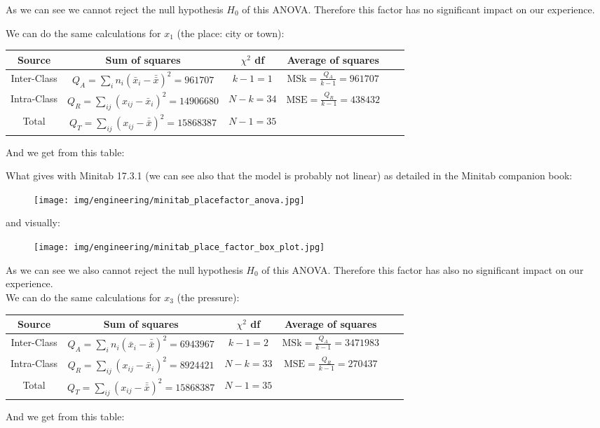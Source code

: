 	As we can see we cannot reject the null hypothesis $H_0$ of this ANOVA. Therefore this factor has no significant impact on our experience.
	
	We can do the same calculations for $x_1$ (the place: city or town):
	\begin{table}[H]\small
	\renewcommand{\arraystretch}{1.2}
	\begin{tabular}{cccccc}\hline
	Source & Sum of squares & $\chi^2$ df & Average of squares \\ \hline
	Inter-Class & $Q_A=\displaystyle\sum_{i}n_i\left(\bar{x}_{i}-\bar{\bar{x}}\right)^2=961707$ & $k-1=1$ & $\text{MSk}=\displaystyle\frac{Q_A}{k-1}=961707$ \\
	Intra-Class & $Q_R=\displaystyle\sum_{ij}\left(x_{ij}-\bar{x}_i\right)^2=14906680$ & $N-k=34$ & $ \text{MSE}=\displaystyle\frac{Q_R}{k-1}=438432$ \\
	Total & $Q_T=\displaystyle\sum_{ij}\left(x_{ij}-\bar{\bar{x}}\right)^2=15868387$ & $N-1=35$ & \\ \hline
	\end{tabular}
	\end{table}
	And we get from this table:
	
	What gives with Minitab 17.3.1 (we can see also that the model is probably not linear) as detailed in the Minitab companion book:
	\begin{figure}[H]
		\begin{center}
		\texttt{[image: img/engineering/minitab\_placefactor\_anova.jpg]}
		\end{center}	
	\end{figure}
	and visually:
	\begin{figure}[H]
		\begin{center}
		\texttt{[image: img/engineering/minitab\_place\_factor\_box\_plot.jpg]}
		\end{center}	
	\end{figure}	
	As we can see we also cannot reject the null hypothesis $H_0$ of this ANOVA. Therefore this factor has also no significant impact on our experience.\\
	
	We can do the same calculations for $x_3$ (the pressure):
	\begin{table}[H]\small
	\renewcommand{\arraystretch}{1.2}
	\begin{tabular}{cccccc}\hline
	Source & Sum of squares & $\chi^2$ df & Average of squares \\ \hline
	Inter-Class & $Q_A=\displaystyle\sum_{i}n_i\left(\bar{x}_{i}-\bar{\bar{x}}\right)^2=6943967$ & $k-1=2$ & $\text{MSk}=\displaystyle\frac{Q_A}{k-1}=3471983$ \\
	Intra-Class & $Q_R=\displaystyle\sum_{ij}\left(x_{ij}-\bar{x}_i\right)^2=8924421$ & $N-k=33$ & $ \text{MSE}=\displaystyle\frac{Q_R}{k-1}=270437$ \\
	Total & $Q_T=\displaystyle\sum_{ij}\left(x_{ij}-\bar{\bar{x}}\right)^2=15868387$ & $N-1=35$ & \\ \hline
	\end{tabular}
	\end{table}
	And we get from this table:
	
